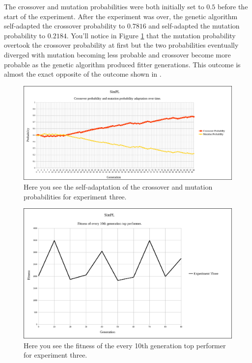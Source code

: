 \documentclass[a4paper,10pt]{article}
\begin{document}
The crossover and mutation probabilities were both initially set to $0.5$ before the start of the experiment. After the experiment was over, the genetic algorithm self-adapted the crossover probability to $0.7816$ and self-adapted the mutation probability to $0.2184$. You'll notice in Figure \ref{fig:exp3_self_adapt} that the mutation probability overtook the crossover probability at first but the two probabilities eventually diverged with mutation becoming less probable and crossover become more probable as the genetic algorithm produced fitter generations. This outcome is almost the exact opposite of the outcome shown in \cite{self_adapt}.

\begin{figure}[H]  
  \centering
  \includegraphics[width=1\textwidth]{figures/exp3_self_adapt.png}
  \caption{Here you see the self-adaptation of the crossover and mutation probabilities for experiment three.}
  \label{fig:exp3_self_adapt}
\end{figure}

\begin{figure}[H]  
  \centering
  \includegraphics[width=1\textwidth]{figures/exp3_10_tops.png}
  \caption{Here you see the fitness of the every 10th generation top performer for experiment three.}
  \label{fig:exp3_10_tops}
\end{figure}
\end{document}
